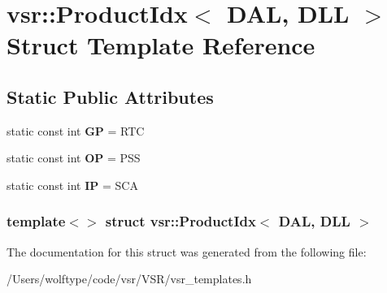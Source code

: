 \hypertarget{structvsr_1_1_product_idx_3_01_d_a_l_00_01_d_l_l_01_4}{\section{vsr\-:\-:Product\-Idx$<$ D\-A\-L, D\-L\-L $>$ Struct Template Reference}
\label{structvsr_1_1_product_idx_3_01_d_a_l_00_01_d_l_l_01_4}
}
\subsection*{Static Public Attributes}
\begin{DoxyCompactItemize}
\item 
\hypertarget{structvsr_1_1_product_idx_3_01_d_a_l_00_01_d_l_l_01_4_a551cd47ed86c585624cd97bed1ff5d6b}{static const int {\bfseries G\-P} = R\-T\-C}\label{structvsr_1_1_product_idx_3_01_d_a_l_00_01_d_l_l_01_4_a551cd47ed86c585624cd97bed1ff5d6b}

\item 
\hypertarget{structvsr_1_1_product_idx_3_01_d_a_l_00_01_d_l_l_01_4_a7d3741707981e45d4f4a07ec92c75714}{static const int {\bfseries O\-P} = P\-S\-S}\label{structvsr_1_1_product_idx_3_01_d_a_l_00_01_d_l_l_01_4_a7d3741707981e45d4f4a07ec92c75714}

\item 
\hypertarget{structvsr_1_1_product_idx_3_01_d_a_l_00_01_d_l_l_01_4_a39223ffa63c2ff9ff37a6e236ea699bb}{static const int {\bfseries I\-P} = S\-C\-A}\label{structvsr_1_1_product_idx_3_01_d_a_l_00_01_d_l_l_01_4_a39223ffa63c2ff9ff37a6e236ea699bb}

\end{DoxyCompactItemize}
\subsubsection*{template$<$$>$ struct vsr\-::\-Product\-Idx$<$ D\-A\-L, D\-L\-L $>$}



The documentation for this struct was generated from the following file\-:\begin{DoxyCompactItemize}
\item 
/\-Users/wolftype/code/vsr/\-V\-S\-R/vsr\-\_\-templates.\-h\end{DoxyCompactItemize}
